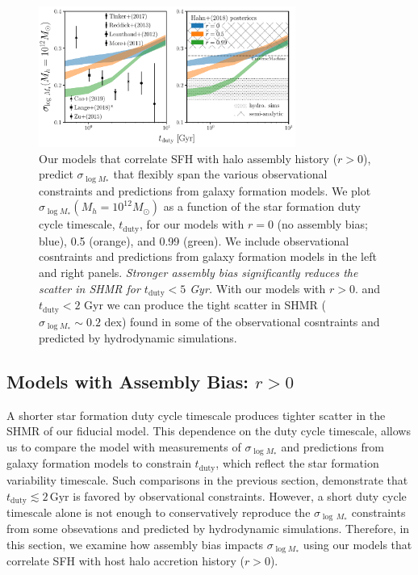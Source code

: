\documentclass[12pt, letterpaper, preprint, tighten]{aastex62}
\newcommand{\edt}[1]{{\color{dred}{\bf} #1}}
\newcommand{\siglogm}{\sigma_{\log M_*}}
\begin{document}
\begin{figure}
\begin{center}
\includegraphics[width=0.75\textwidth]{figs/SHMRscatter_tduty_abias2.pdf}
    \caption{\edt{Our models that correlate SFH with halo assembly history ($r > 0$),
    predict $\siglogm$ that flexibly span the various observational
    constraints and predictions from galaxy formation models.}
    We plot $\siglogm(M_h=10^{12}M_\odot)$ as a function of the star formation
    duty cycle timescale, $t_\mathrm{duty}$, for our
    \edt{models with $r = 0$ (no assembly bias; blue), 0.5 (orange), and 0.99 (green).
    We include observational cosntraints and predictions from galaxy formation models
    in the left and right panels.
    \emph{Stronger assembly bias significantly reduces the scatter in SHMR for
    $t_\mathrm{duty} < 5$ Gyr.}
    With our models with $r > 0.$ and $t_\mathrm{duty} < 2$ Gyr
    we can produce the tight scatter in SHMR ($\siglogm \sim 0.2$ dex) found in
    some of the observational cosntraints and predicted by hydrodynamic simulations}.
    }
\label{fig:sigMstar_duty_abias}
\end{center}
\end{figure}

\subsection{\edt{Models with Assembly Bias: $r > 0$}}
A shorter star formation duty cycle timescale produces tighter scatter in the
SHMR of our \edt{fiducial} model. This dependence on the duty cycle timescale,
allows us to compare the model with measurements of $\sigma_{\log M_*}$ and
predictions from galaxy formation models to constrain $t_\mathrm{duty}$, which
reflect the star formation variability timescale. Such comparisons in the previous
section, demonstrate that $t_\mathrm{duty} \lesssim 2\,\mathrm{Gyr}$ is
favored by observational constraints. However, a short duty cycle
timescale alone is not enough to conservatively reproduce the $\sigma_{\log\,M_*}$
\edt{constraints from some obsevations and predicted by hydrodynamic simulations.
Therefore, in this section, we examine how assembly bias impacts $\sigma_{\log M_*}$
using our models that correlate SFH with host halo accretion history ($r > 0$).}
\end{document}
